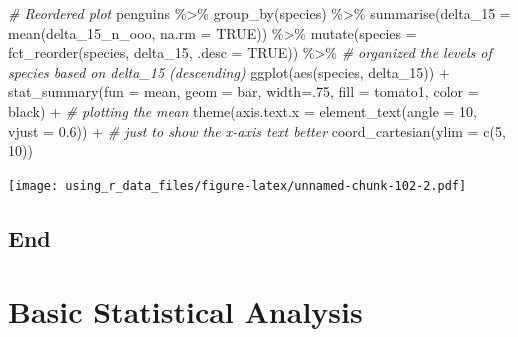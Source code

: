 \documentclass[
]{book}
\newenvironment{Shaded}{\begin{snugshade}}{\end{snugshade}}
\newcommand{\AttributeTok}[1]{\textcolor[rgb]{0.77,0.63,0.00}{#1}}
\newcommand{\CommentTok}[1]{\textcolor[rgb]{0.56,0.35,0.01}{\textit{#1}}}
\newcommand{\ConstantTok}[1]{\textcolor[rgb]{0.00,0.00,0.00}{#1}}
\newcommand{\DecValTok}[1]{\textcolor[rgb]{0.00,0.00,0.81}{#1}}
\newcommand{\FloatTok}[1]{\textcolor[rgb]{0.00,0.00,0.81}{#1}}
\newcommand{\FunctionTok}[1]{\textcolor[rgb]{0.00,0.00,0.00}{#1}}
\newcommand{\NormalTok}[1]{#1}
\newcommand{\SpecialCharTok}[1]{\textcolor[rgb]{0.00,0.00,0.00}{#1}}
\newcommand{\StringTok}[1]{\textcolor[rgb]{0.31,0.60,0.02}{#1}}
\begin{document}
\begin{Shaded}
\begin{Highlighting}[]
\CommentTok{\# Reordered plot}
\NormalTok{penguins }\SpecialCharTok{\%\textgreater{}\%} 
  \FunctionTok{group\_by}\NormalTok{(species) }\SpecialCharTok{\%\textgreater{}\%} 
  \FunctionTok{summarise}\NormalTok{(}\AttributeTok{delta\_15 =} \FunctionTok{mean}\NormalTok{(delta\_15\_n\_ooo, }\AttributeTok{na.rm =} \ConstantTok{TRUE}\NormalTok{)) }\SpecialCharTok{\%\textgreater{}\%} 
  \FunctionTok{mutate}\NormalTok{(}\AttributeTok{species =} \FunctionTok{fct\_reorder}\NormalTok{(species, delta\_15, }\AttributeTok{.desc =} \ConstantTok{TRUE}\NormalTok{)) }\SpecialCharTok{\%\textgreater{}\%}  \CommentTok{\# organized the levels of species based on delta\_15 (descending)}
  \FunctionTok{ggplot}\NormalTok{(}\FunctionTok{aes}\NormalTok{(species, delta\_15)) }\SpecialCharTok{+}
  \FunctionTok{stat\_summary}\NormalTok{(}\AttributeTok{fun =}\NormalTok{ mean, }\AttributeTok{geom =} \StringTok{\textquotesingle{}bar\textquotesingle{}}\NormalTok{, }\AttributeTok{width=}\NormalTok{.}\DecValTok{75}\NormalTok{, }\AttributeTok{fill =} \StringTok{\textquotesingle{}tomato1\textquotesingle{}}\NormalTok{, }\AttributeTok{color =} \StringTok{\textquotesingle{}black\textquotesingle{}}\NormalTok{) }\SpecialCharTok{+}  \CommentTok{\# plotting the mean}
  \FunctionTok{theme}\NormalTok{(}\AttributeTok{axis.text.x =} \FunctionTok{element\_text}\NormalTok{(}\AttributeTok{angle =} \DecValTok{10}\NormalTok{, }\AttributeTok{vjust =} \FloatTok{0.6}\NormalTok{)) }\SpecialCharTok{+} \CommentTok{\# just to show the x{-}axis text better}
  \FunctionTok{coord\_cartesian}\NormalTok{(}\AttributeTok{ylim =} \FunctionTok{c}\NormalTok{(}\DecValTok{5}\NormalTok{, }\DecValTok{10}\NormalTok{))}
\end{Highlighting}
\end{Shaded}

\texttt{[image: using\_r\_data\_files/figure-latex/unnamed-chunk-102-2.pdf]}

\hypertarget{end-1}{%
\section{End}\label{end-1}}

\hypertarget{basic-statistical-analysis}{%
\chapter{Basic Statistical Analysis}\label{basic-statistical-analysis}}
\end{document}
